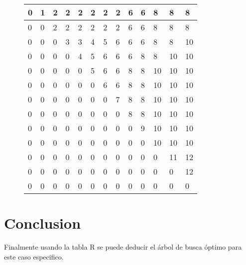 \documentclass{article}
\begin{document}
\centering 
\begin{figure}[H]
\label{my-label2}
\begin{tabular}{|l|l|l|l|l|l|l|l|l|l|l|l|l|}
\hline
0& 1& 2& 2& 2& 2& 2& 2& 6& 6& 8& 8& 8\\ \hline
0& 0& 2& 2& 2& 2& 2& 2& 6& 6& 8& 8& 8\\ \hline
0& 0& 0& 3& 3& 4& 5& 6& 6& 6& 8& 8& 10\\ \hline
0& 0& 0& 0& 4& 5& 6& 6& 6& 8& 8& 10& 10\\ \hline
0& 0& 0& 0& 0& 5& 6& 6& 8& 8& 10& 10& 10\\ \hline
0& 0& 0& 0& 0& 0& 6& 6& 8& 8& 10& 10& 10\\ \hline
0& 0& 0& 0& 0& 0& 0& 7& 8& 8& 10& 10& 10\\ \hline
0& 0& 0& 0& 0& 0& 0& 0& 8& 8& 10& 10& 10\\ \hline
0& 0& 0& 0& 0& 0& 0& 0& 0& 9& 10& 10& 10\\ \hline
0& 0& 0& 0& 0& 0& 0& 0& 0& 0& 10& 10& 10\\ \hline
0& 0& 0& 0& 0& 0& 0& 0& 0& 0& 0& 11& 12\\ \hline
0& 0& 0& 0& 0& 0& 0& 0& 0& 0& 0& 0& 12\\ \hline
0& 0& 0& 0& 0& 0& 0& 0& 0& 0& 0& 0& 0\\ \hline
\end{tabular}
\end{figure}
    
    

\section{Conclusion}
Finalmente usando la tabla R se puede deducir el árbol de busca óptimo para este caso especifico.
\end{document}
